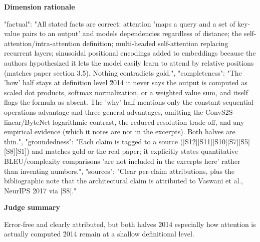 \documentclass[10pt]{article}
\begin{document}
\textbf{Dimension rationale}
\begin{EvidenceText}
{
  "factual": "All stated facts are correct: attention 'maps a query and a set of key-value pairs to an output' and models dependencies regardless of distance; the self-attention/intra-attention definition; multi-headed self-attention replacing recurrent layers; sinusoidal positional encodings added to embeddings because the authors hypothesized it lets the model easily learn to attend by relative positions (matches paper section 3.5). Nothing contradicts gold.",
  "completeness": "The 'how' half stays at definition level \u2014 it never says the output is computed as scaled dot products, softmax normalization, or a weighted value sum, and itself flags the formula as absent. The 'why' half mentions only the constant-sequential-operations advantage and three general advantages, omitting the ConvS2S-linear/ByteNet-logarithmic contrast, the reduced-resolution trade-off, and any empirical evidence (which it notes are not in the excerpts). Both halves are thin.",
  "groundedness": "Each claim is tagged to a source ([S12][S11][S10][S7][S5][S8][S1]) and matches gold or the real paper; it explicitly states quantitative BLEU/complexity comparisons 'are not included in the excerpts here' rather than inventing numbers.",
  "sources": "Clear per-claim attributions, plus the bibliographic note that the architectural claim is attributed to Vaswani et al., NeurIPS 2017 via [S8]."
}
\end{EvidenceText}

\textbf{Judge summary}
\begin{EvidenceText}
Error-free and clearly attributed, but both halves \u2014 especially how attention is actually computed \u2014 remain at a shallow definitional level.
\end{EvidenceText}
\end{document}
